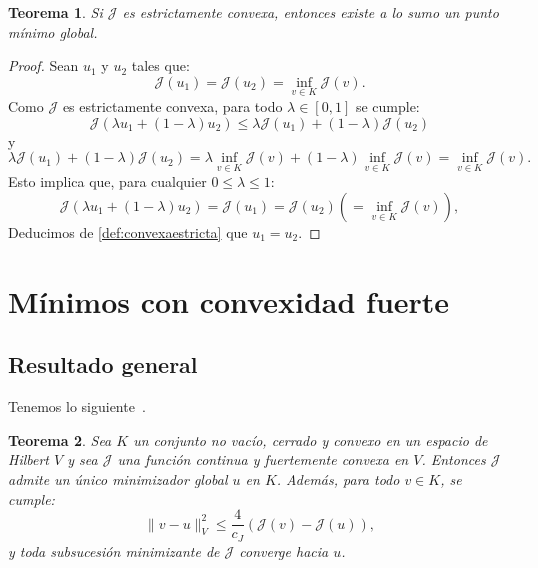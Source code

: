 \documentclass[12pt]{book}
\newtheorem{theorem}{Teorema}
\theoremstyle{definition}
\theoremstyle{plain}
\theoremstyle{remark}
\begin{document}
\begin{theorem}
Si $\mathcal{J}$ es estrictamente convexa, entonces existe a lo sumo un punto mínimo global.
\end{theorem}

\begin{proof}
Sean $u_1$ y $u_2$ tales que:
\[
\mathcal{J}(u_1) = \mathcal{J}(u_2) = \inf_{v \in K} \mathcal{J}(v).
\]
Como $\mathcal{J}$ es estrictamente convexa, para todo $\lambda \in [0,1]$ se cumple:
\[
\mathcal{J}(\lambda u_1 + (1-\lambda) u_2) \leq \lambda \mathcal{J}(u_1) + (1-\lambda) \mathcal{J}(u_2) 
\]
y
\[
\lambda \mathcal{J}(u_1) + (1-\lambda) \mathcal{J}(u_2) = \lambda \inf_{v \in K} \mathcal{J}(v) + (1-\lambda) \inf_{v \in K} \mathcal{J}(v) = \inf_{v \in K} \mathcal{J}(v).
\]
Esto implica que, para cualquier $0 \leq \lambda \leq 1$:
\[
\mathcal{J}(\lambda u_1 + (1-\lambda) u_2) = 
\mathcal{J}(u_1) = \mathcal{J}(u_2) (=
\inf_{v \in K} \mathcal{J}(v)),
\]
Deducimos de \eqref{def:convexaestricta} que
$u_1=u_2$.
\end{proof}

\section{Mínimos con convexidad fuerte}

\subsection{Resultado general}

Tenemos lo siguiente~\cite{allaire2007}.

\begin{theorem}
    Sea \(K\) un conjunto no vacío, cerrado y convexo en un espacio de Hilbert \(V\) y sea \(\mathcal{J}\) una función continua y fuertemente convexa en \(V\). Entonces \(\mathcal{J}\) admite un único minimizador global \(u\) en \(K\). Además, para todo \(v \in K\), se cumple:
    \[
    \| v - u \|_V^2 \leq \frac{4}{c_J} \left( \mathcal{J}(v) - \mathcal{J}(u) \right),
    \]
    y toda subsucesión minimizante de \(\mathcal{J}\) converge hacia \(u\).
\end{theorem}
\end{document}
